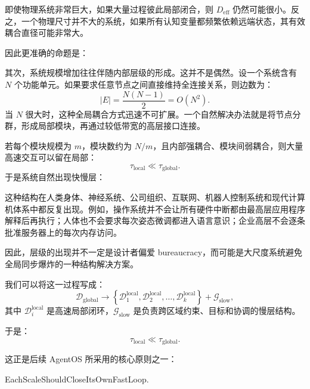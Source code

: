 即使物理系统非常巨大，如果大量过程彼此局部闭合，则 $D_{\mathrm{eff}}$ 仍然可能很小。反之，一个物理尺寸并不大的系统，如果所有认知变量都频繁依赖远端状态，其有效耦合直径可能非常大。

因此更准确的命题是：

\begin{statementbox}
\centering
{}
\end{statementbox}

其次，系统规模增加往往伴随内部层级的形成。这并不是偶然。设一个系统含有 $N$ 个功能单元。如果要求任意节点之间直接维持全连接关系，则边数为：
\[
|E|
=
\frac{N(N-1)}{2}
=
O(N^2).
\]
当 $N$ 很大时，这种全局耦合方式迅速不可扩展。一个自然解决办法就是将节点分群，形成局部模块，再通过较低带宽的高层接口连接。

若每个模块规模为 $m$，模块数约为 $N/m$，且内部强耦合、模块间弱耦合，则大量高速交互可以留在局部：
\[
\tau_{\mathrm{local}}
\ll
\tau_{\mathrm{global}}.
\]
于是系统自然出现快慢层：

\begin{statementbox}
\centering
{}
\end{statementbox}

这种结构在人类身体、神经系统、公司组织、互联网、机器人控制系统和现代计算机体系中都反复出现。例如，操作系统并不会让所有硬件中断都由最高层应用程序解释后再执行；人体也不会要求每次姿态微调都进入语言意识；企业高层不会逐条批准服务器上的每次内存访问。

因此，层级的出现并不一定是设计者偏爱 bureaucracy，而可能是大尺度系统避免全局同步爆炸的一种结构解决方案。

我们可以将这一过程写成：
\[
\mathcal D_{\mathrm{global}}
\rightarrow
\left\{
\mathcal D_1^{\mathrm{local}},
\mathcal D_2^{\mathrm{local}},
\ldots,
\mathcal D_k^{\mathrm{local}}
\right\}
+
\mathcal G_{\mathrm{slow}},
\]
其中 $\mathcal D_i^{\mathrm{local}}$ 是高速局部闭环，$\mathcal G_{\mathrm{slow}}$ 是负责跨区域约束、目标和协调的慢层结构。

于是：
\[
\boxed{
\tau_{\mathrm{local}}
\ll
\tau_{\mathrm{global}}.
}
\]

这正是后续 AgentOS 所采用的核心原则之一：
\begin{statementbox}
EachScaleShouldCloseItsOwnFastLoop.
\end{statementbox}

